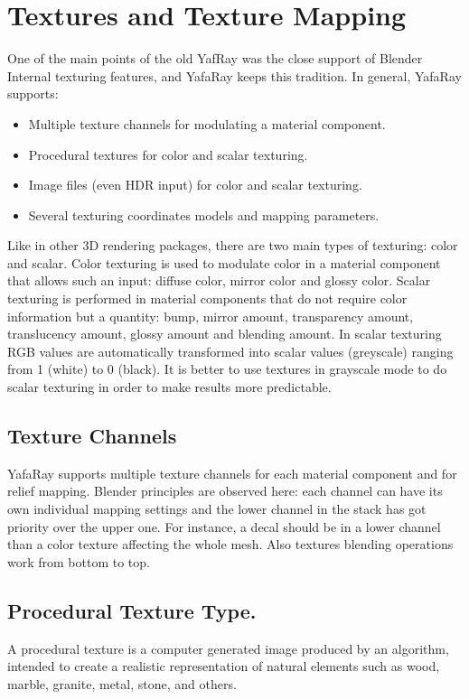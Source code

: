 \chapter{Textures and Texture Mapping}\label{chapter:textureinput}

One of the main points of the old YafRay was the close support of Blender Internal texturing features, and YafaRay keeps this tradition. In general, YafaRay supports:
\begin{itemize}
\item Multiple texture channels for modulating a material component.
\item Procedural textures for color and scalar texturing.
\item Image files (even HDR input) for color and scalar texturing.
\item Several texturing coordinates models and mapping parameters.
\end{itemize}

Like in other 3D rendering packages, there are two main types of texturing: color and scalar. Color texturing is used to modulate color in a material component that allows such an input: diffuse color, mirror color and glossy color. Scalar texturing is performed in material components that do not require color information but a quantity: bump, mirror amount, transparency amount, translucency amount, glossy amount and blending amount. In scalar texturing RGB values are automatically transformed into scalar values (greyscale) ranging from 1 (white) to 0 (black). It is better to use textures in grayscale mode to do scalar texturing in order to make results more predictable.
\section{Texture Channels}

YafaRay supports multiple texture channels for each material component and for relief mapping. Blender principles are observed here: each channel can have its own individual mapping settings and the lower channel in the stack has got priority over the upper one. For instance, a decal should be in a lower channel than a color texture affecting the whole mesh. Also textures blending operations work from bottom to top.
\section{Procedural Texture Type.}

A procedural texture is a computer generated image produced by an algorithm, intended to create a realistic representation of natural elements such as wood, marble, granite, metal, stone, and others.


